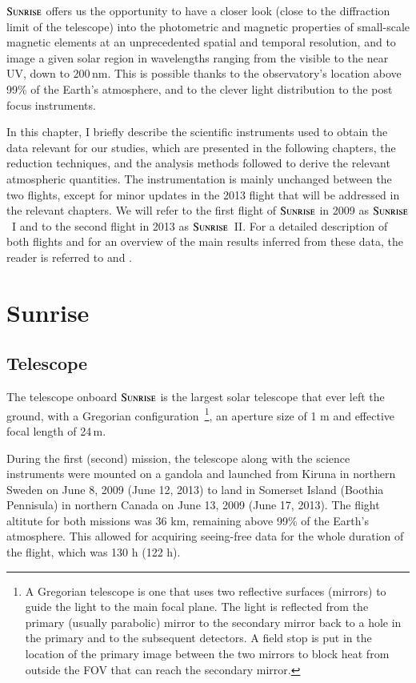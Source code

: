\documentclass[goettingen, gauss, print]{thesis}
\begin{document}
$\textsc{Sunrise}$ offers us the opportunity to have a closer look (close to the diffraction limit of the telescope) into the photometric and magnetic properties of small-scale magnetic elements at an unprecedented spatial and temporal resolution, and to image a given solar region in wavelengths ranging from the visible to the near UV, down to 200\,nm. This is possible thanks to the observatory's location above 99\% of the Earth's atmosphere, and to the clever light distribution to the post focus instruments.

In this chapter, I briefly describe the scientific instruments used to obtain the data relevant for our studies, which are presented in the following chapters, the reduction techniques, and the analysis methods followed to derive the relevant atmospheric quantities. 
The instrumentation is mainly unchanged between the two flights, except for minor updates in the 2013 flight that will be addressed in the relevant chapters. We will refer to the first flight of $\textsc{Sunrise}$ in 2009 as $\textsc{Sunrise}$~I and to the second flight in 2013 as $\textsc{Sunrise}$~II. For a detailed description of both flights and for an overview of the main results inferred from these data, the reader is referred to \cite{solanki_sunrise:_2010} and \cite{solanki_second_2017}.

\section{Sunrise}
\label{intro-sunrise}
\subsection{Telescope}
\label{intro-telescope}
The telescope onboard $\textsc{Sunrise}$ is the largest solar telescope that ever left the ground, with a Gregorian configuration~\footnote{A Gregorian telescope is one that uses two reflective surfaces (mirrors) to guide the light to the main focal plane. The light is reflected from the primary (usually parabolic) mirror to the secondary mirror back to a hole in the primary and to the subsequent detectors. A field stop is put in the location of the primary image between the two mirrors to block heat from outside the FOV that can reach the secondary mirror.}, an aperture size of 1 m and effective focal length of 24\,m. 

During the first (second) mission, the telescope along with the science instruments were mounted on a gandola and launched from Kiruna in northern Sweden on June 8, 2009 (June 12, 2013) to land in Somerset Island (Boothia Pennisula) in northern Canada on June 13, 2009 (June 17, 2013). The flight altitute for both missions was 36 km, remaining above 99\% of the Earth's atmosphere. This allowed for acquiring seeing-free data for the whole duration of the flight, which was 130 h (122 h).
\end{document}
